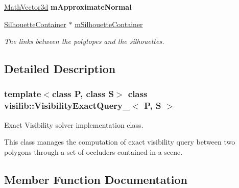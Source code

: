 \begin{DoxyCompactItemize}
\mbox{\label{classvisilib_1_1_visibility_exact_query___af3d8523a563062b7e44cba8ada447883}} 
\mbox{\hyperlink{classvisilib_1_1_math_vector3__}{Math\+Vector3d}} {\bfseries m\+Approximate\+Normal}
\item 
\mbox{\label{classvisilib_1_1_visibility_exact_query___a4a90222924ec37ee6523ae2152bead1a}} 
\mbox{\hyperlink{classvisilib_1_1_silhouette_container}{Silhouette\+Container}} $\ast$ \mbox{\hyperlink{classvisilib_1_1_visibility_exact_query___a4a90222924ec37ee6523ae2152bead1a}{m\+Silhouette\+Container}}
\begin{DoxyCompactList}\small\item\em The links between the polytopes and the silhouettes. \end{DoxyCompactList}\end{DoxyCompactItemize}


\subsection{Detailed Description}
\subsubsection*{template$<$class P, class S$>$\newline
class visilib\+::\+Visibility\+Exact\+Query\+\_\+$<$ P, S $>$}

Exact Visibility solver implementation class. 

This class manages the computation of exact visibility query between two polygons through a set of occluders contained in a scene. 

\subsection{Member Function Documentation}
\mbox{\label{classvisilib_1_1_visibility_exact_query___a37d430f305c3024cc8ab9efb7dbaf534}} 
